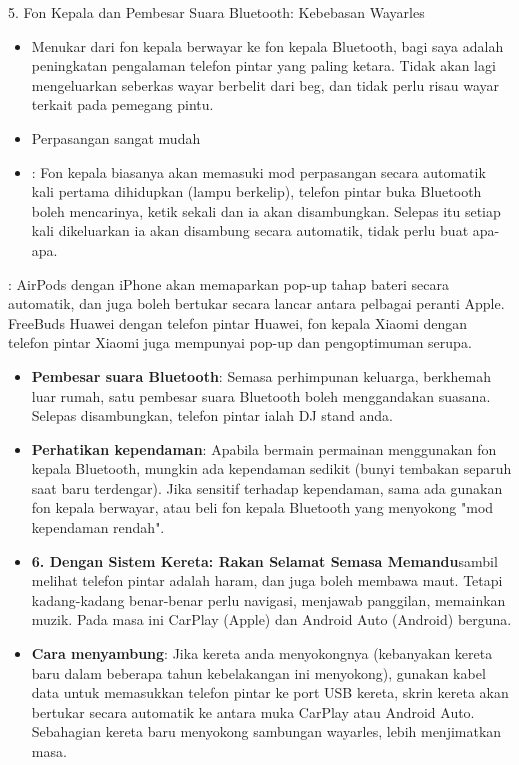 5. Fon Kepala dan Pembesar Suara Bluetooth: Kebebasan Wayarles

\begin{itemize}
  \item Menukar dari fon kepala berwayar ke fon kepala Bluetooth, bagi saya adalah peningkatan pengalaman telefon pintar yang paling ketara. Tidak akan lagi mengeluarkan seberkas wayar berbelit dari beg, dan tidak perlu risau wayar terkait pada pemegang pintu.
  \item Perpasangan sangat mudah
  \item : Fon kepala biasanya akan memasuki mod perpasangan secara automatik kali pertama dihidupkan (lampu berkelip), telefon pintar buka Bluetooth boleh mencarinya, ketik sekali dan ia akan disambungkan. Selepas itu setiap kali dikeluarkan ia akan disambung secara automatik, tidak perlu buat apa-apa.
\end{itemize}


: AirPods dengan iPhone akan memaparkan pop-up tahap bateri secara automatik, dan juga boleh bertukar secara lancar antara pelbagai peranti Apple. FreeBuds Huawei dengan telefon pintar Huawei, fon kepala Xiaomi dengan telefon pintar Xiaomi juga mempunyai pop-up dan pengoptimuman serupa.

\begin{itemize}
  \item \textbf{Pembesar suara Bluetooth}: Semasa perhimpunan keluarga, berkhemah luar rumah, satu pembesar suara Bluetooth boleh menggandakan suasana. Selepas disambungkan, telefon pintar ialah DJ stand anda.
  \item \textbf{Perhatikan kependaman}: Apabila bermain permainan menggunakan fon kepala Bluetooth, mungkin ada kependaman sedikit (bunyi tembakan separuh saat baru terdengar). Jika sensitif terhadap kependaman, sama ada gunakan fon kepala berwayar, atau beli fon kepala Bluetooth yang menyokong "mod kependaman rendah".
  \item \textbf{6. Dengan Sistem Kereta: Rakan Selamat Semasa Memandu}sambil melihat telefon pintar adalah haram, dan juga boleh membawa maut. Tetapi kadang-kadang benar-benar perlu navigasi, menjawab panggilan, memainkan muzik. Pada masa ini CarPlay (Apple) dan Android Auto (Android) berguna.
  \item \textbf{Cara menyambung}: Jika kereta anda menyokongnya (kebanyakan kereta baru dalam beberapa tahun kebelakangan ini menyokong), gunakan kabel data untuk memasukkan telefon pintar ke port USB kereta, skrin kereta akan bertukar secara automatik ke antara muka CarPlay atau Android Auto. Sebahagian kereta baru menyokong sambungan wayarles, lebih menjimatkan masa.
\end{itemize}

